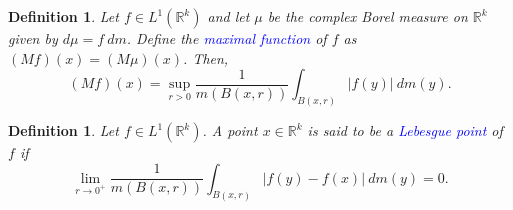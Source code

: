 \documentclass[12pt]{article}
\theoremstyle{thmstyle}
\theoremstyle{defstyle}
\newtheorem{definition}[theorem]{Definition}
\newcommand{\R}{\mathbb{R}}
\newcommand{\define}[1]{\textcolor{blue}{\textit{#1}}}
\begin{document}
\begin{definition}
    Let $f\in L^1(\R^k)$ and let $\mu$ be the complex Borel measure on $\R^k$ given by $d\mu = f~dm$. Define the \define{maximal function} of $f$ as $(Mf)(x) = (M\mu)(x)$. Then, 
    \begin{equation*}
        (Mf)(x) = \sup_{r > 0}\frac{1}{m(B(x, r))}\int_{B(x, r)}|f(y)|~dm(y).
    \end{equation*}
\end{definition}

\begin{definition}
    Let $f\in L^1(\R^k)$. A point $x\in\R^k$ is said to be a \define{Lebesgue point} of $f$ if 
    \begin{equation*}
        \lim_{r\to 0^+}\frac{1}{m(B(x, r))}\int_{B(x, r)}|f(y) - f(x)|~dm(y) = 0.
    \end{equation*}
\end{definition}
\end{document}
